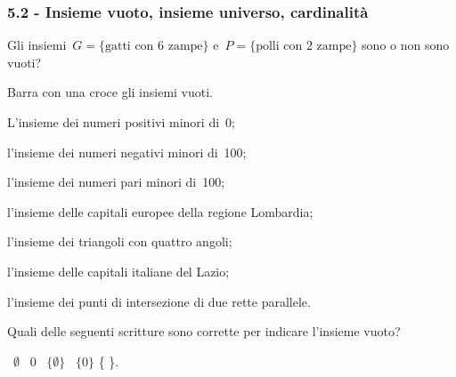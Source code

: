 \subsubsection*{5.2 - Insieme vuoto, insieme universo, cardinalità}
\begin{esercizio}
\label{ese:5.9}
Gli insiemi~$G =\{\text{gatti con~6 zampe}\}$ e~$P = \{\text{polli con~2 zampe}\}$ sono o non sono vuoti?
\end{esercizio}

\begin{esercizio}[\Ast]
\label{ese:5.10}
Barra con una croce gli insiemi vuoti.
\begin{enumeratea}
 \item L'insieme dei numeri positivi minori di~0;
 \item l'insieme dei numeri negativi minori di~100;
 \item l'insieme dei numeri pari minori di~100;
 \item l'insieme delle capitali europee della regione Lombardia;
 \item l'insieme dei triangoli con quattro angoli;
 \item l'insieme delle capitali italiane del Lazio;
 \item l'insieme dei punti di intersezione di due rette parallele.
 \end{enumeratea}
\end{esercizio}

\begin{esercizio}[\Ast]
\label{ese:5.11}
Quali delle seguenti scritture sono corrette per indicare
l'insieme vuoto?
\begin{center}
 \boxA\quad~$\emptyset $ \quad\boxB\quad~0 \quad\boxC\quad~$\{\emptyset \}$ \quad\boxD\quad~$\{0\}$ \quad\boxE\quad \{ \}.
\end{center}
\end{esercizio}


